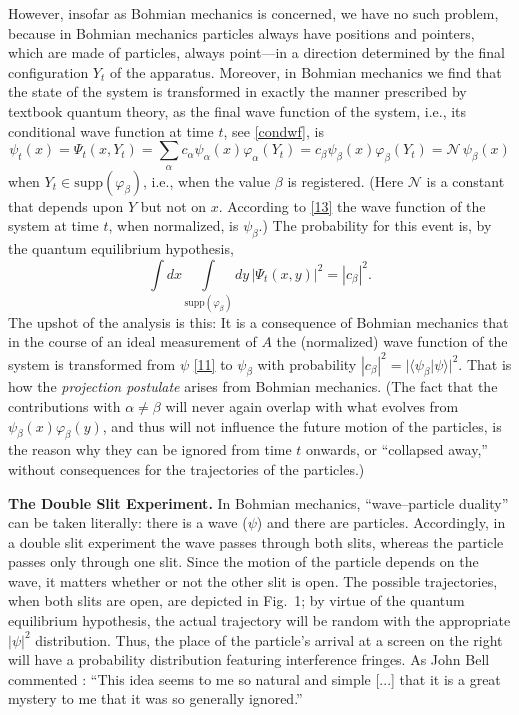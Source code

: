 \documentclass[12pt]{report}
\newcommand{\scp}[2]{\langle #1|#2 \rangle}
\newcommand{\be}{\begin{equation}}
\newcommand{\ee}{\end{equation}}
\newcommand{\see}{}%
\begin{document}
However, insofar as Bohmian mechanics is concerned, we have no such
problem, because in Bohmian mechanics particles always have positions and
pointers, which are made of particles, always point---in a direction
determined by the final configuration $Y_t$ of the apparatus. Moreover, in
Bohmian mechanics we find that the state of the system is transformed in
exactly the manner prescribed by textbook quantum theory, as 
the final wave function of the system, i.e., its conditional wave function at time $t$, see \eqref{condwf}, is
\be\label{13}
\psi_t(x)=%
\Psi_t(x,Y_t)=%
\sum_{\alpha}c_{\alpha}\psi_{\alpha}(x)\varphi_{\alpha}(Y_t)=%
c_\beta\psi_\beta(x)\varphi_\beta(Y_t)
=\mathcal{N}\, \psi_\beta(x)
\ee
when $Y_t\in\text{supp}(\varphi_\beta)$, 
i.e., when the value $\beta$ is registered. 
(Here $\mathcal{N}$ is a constant that depends upon $Y$ but not on $x$. According to \eqref{13} the wave function of the system at time $t$, when normalized, is $\psi_\beta$.) 
The probability for this event is, by the quantum equilibrium hypothesis,
\be
\int dx\int\limits_{\text{supp}(\varphi_\beta)} dy\,|\Psi_t(x,y)|^2 = |c_\beta|^2.
\ee
The upshot of the analysis is this: It is a consequence of Bohmian mechanics that in the course of an ideal measurement of $A$ the (normalized) wave function of the system is transformed from $\psi$ \eqref{11} to $\psi_\beta$ with probability $|c_\beta|^2 = \bigl| \scp{\psi_\beta}{\psi} \bigr|^2$. That is how the \see \emph{projection postulate} arises from Bohmian mechanics. (The fact that the contributions with $\alpha\neq \beta$ will never again overlap with what evolves from $\psi_\beta(x)\varphi_\beta(y)$, and thus will not influence the future motion of the particles, is the reason why they can be ignored from time $t$ onwards, or ``collapsed away,'' without consequences for the trajectories of the particles.)

\bigskip

\noindent\textbf{The Double Slit Experiment.}
In Bohmian mechanics, ``wave--particle duality'' can be taken literally: there is a wave ($\psi$) and there are particles. Accordingly, in a double slit experiment the wave passes through both slits, whereas the particle passes only through one slit. Since the motion of the particle depends on the wave, it matters whether or not the other slit is open. The possible trajectories, when both slits are open, are depicted in Fig.~1; by virtue of the quantum equilibrium hypothesis, the actual trajectory will be random with the appropriate $|\psi|^2$ distribution. Thus, the place of the particle's arrival at a screen on the right will have a probability distribution featuring interference fringes. As John Bell commented \cite[p.~191]{Bell87b}: ``This idea seems to me so natural and simple [...] that it is a great mystery to me that it was so generally ignored.''
\end{document}
